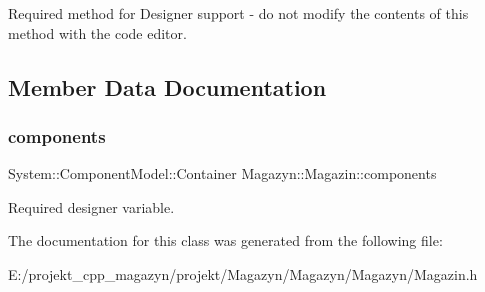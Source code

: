Required method for Designer support -\/ do not modify the contents of this method with the code editor. 



\subsection{Member Data Documentation}
\hypertarget{class_magazyn_1_1_magazin_afa865a4ec66de6ca82ca6f1d3abf3c80}{}\label{class_magazyn_1_1_magazin_afa865a4ec66de6ca82ca6f1d3abf3c80} 
\subsubsection{\texorpdfstring{components}{components}}
{\footnotesize\ttfamily System\+::\+Component\+Model\+::\+Container Magazyn\+::\+Magazin\+::components\hspace{0.3cm}{\ttfamily [private]}}





Required designer variable. 

The documentation for this class was generated from the following file\+:\begin{DoxyCompactItemize}
\item 
E\+:/projekt\+\_\+cpp\+\_\+magazyn/projekt/\+Magazyn/\+Magazyn/\+Magazyn/Magazin.\+h\end{DoxyCompactItemize}
